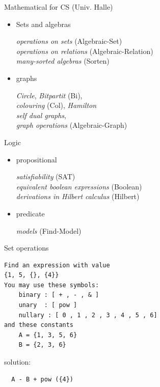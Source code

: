 \begin{slide}{Mathematical for CS (Univ. Halle)}

\begin{itemize}
\item
   Sets and algebras

  \emph{operations on sets}  (Algebraic-Set)
  \\  \emph{operations on relations}  (Algebraic-Relation)
  \\ \emph{many-sorted algebras} (Sorten)
\item
  graphs
  
  \emph{Circle}, \emph{Bitpartit} (Bi),
  \\ \emph{colouring} (Col), \emph{Hamilton} 
  \\ \emph{self dual graphs}, 
  \\ \emph{graph operations} (Algebraic-Graph)
\end{itemize}

\end{slide}
\begin{slide}{Logic}

\begin{itemize}
\item
   propositional

  \emph{satisfiability} (SAT)
  \\ \emph{equivalent boolean expressions} (Boolean)
  \\ \emph{derivations in Hilbert calculus} (Hilbert)
\item
   predicate
  
  \emph{models} (Find-Model)
\end{itemize}

\end{slide}
\begin{slide}{Set operations}
\begin{verbatim}  
Find an expression with value
{1, 5, {}, {4}}
You may use these symbols:
    binary : [ + , - , & ]
    unary  : [ pow ]
    nullary : [ 0 , 1 , 2 , 3 , 4 , 5 , 6]
and these constants
    A = {1, 3, 5, 6}
    B = {2, 3, 6}
\end{verbatim}

solution: \begin{verbatim}  A - B + pow ({4})  \end{verbatim}
\end{slide}
